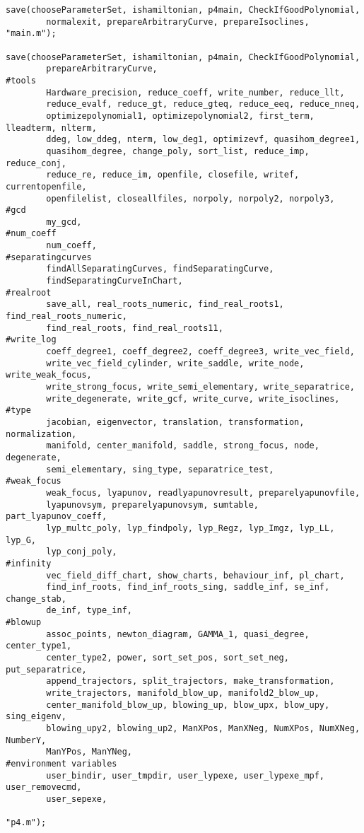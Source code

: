 \documentclass[a4paper,10pt]{article}
\begin{document}
\begin{lstlisting}[name=main]
save(chooseParameterSet, ishamiltonian, p4main, CheckIfGoodPolynomial,
        normalexit, prepareArbitraryCurve, prepareIsoclines, "main.m");

save(chooseParameterSet, ishamiltonian, p4main, CheckIfGoodPolynomial,
        prepareArbitraryCurve,
#tools
        Hardware_precision, reduce_coeff, write_number, reduce_llt,
        reduce_evalf, reduce_gt, reduce_gteq, reduce_eeq, reduce_nneq,
        optimizepolynomial1, optimizepolynomial2, first_term, lleadterm, nlterm,
        ddeg, low_ddeg, nterm, low_deg1, optimizevf, quasihom_degree1,
        quasihom_degree, change_poly, sort_list, reduce_imp, reduce_conj,
        reduce_re, reduce_im, openfile, closefile, writef, currentopenfile, 
        openfilelist, closeallfiles, norpoly, norpoly2, norpoly3,
#gcd
        my_gcd,
#num_coeff
        num_coeff,
#separatingcurves
        findAllSeparatingCurves, findSeparatingCurve,
        findSeparatingCurveInChart,
#realroot
        save_all, real_roots_numeric, find_real_roots1, find_real_roots_numeric,
        find_real_roots, find_real_roots11,
#write_log
        coeff_degree1, coeff_degree2, coeff_degree3, write_vec_field,
        write_vec_field_cylinder, write_saddle, write_node, write_weak_focus,
        write_strong_focus, write_semi_elementary, write_separatrice,
        write_degenerate, write_gcf, write_curve, write_isoclines,
#type
        jacobian, eigenvector, translation, transformation, normalization,
        manifold, center_manifold, saddle, strong_focus, node, degenerate,
        semi_elementary, sing_type, separatrice_test,
#weak_focus
        weak_focus, lyapunov, readlyapunovresult, preparelyapunovfile,
        lyapunovsym, preparelyapunovsym, sumtable, part_lyapunov_coeff,
        lyp_multc_poly, lyp_findpoly, lyp_Regz, lyp_Imgz, lyp_LL, lyp_G,
        lyp_conj_poly,
#infinity
        vec_field_diff_chart, show_charts, behaviour_inf, pl_chart,
        find_inf_roots, find_inf_roots_sing, saddle_inf, se_inf, change_stab,
        de_inf, type_inf,
#blowup
        assoc_points, newton_diagram, GAMMA_1, quasi_degree, center_type1,
        center_type2, power, sort_set_pos, sort_set_neg, put_separatrice,
        append_trajectors, split_trajectors, make_transformation,
        write_trajectors, manifold_blow_up, manifold2_blow_up,
        center_manifold_blow_up, blowing_up, blow_upx, blow_upy, sing_eigenv,
        blowing_upy2, blowing_up2, ManXPos, ManXNeg, NumXPos, NumXNeg, NumberY,
        ManYPos, ManYNeg,
#environment variables
        user_bindir, user_tmpdir, user_lypexe, user_lypexe_mpf, user_removecmd,
        user_sepexe,

"p4.m");
\end{lstlisting}
\end{document}
